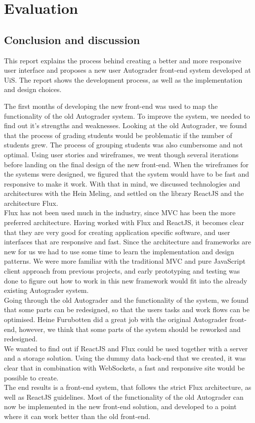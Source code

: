 \chapter{Evaluation}
\section{Conclusion and discussion}

This report explains the process behind creating a better and more responsive user interface and proposes a new user Autograder front-end system developed at UiS. The report shows the development process, as well as the implementation and design choices.

The first months of developing the new front-end was used to map the functionality of the old Autograder system. To improve the system, we needed to find out it's strengths and weaknesses. Looking at the old Autograder, we found that the process of grading students would be problematic if the number of students grew. The process of grouping students was also cumbersome and not optimal. Using user stories and wireframes, we went though several iterations before landing on the final design of the new front-end. When the wireframes for the systems were designed, we figured that the system would have to be fast and responsive to make it work. With that in mind, we discussed technologies and architectures with the Hein Meling, and settled on the library ReactJS and the architecture Flux.\\Flux has not been used much in the industry, since MVC has been the more preferred architecture. Having worked with Flux and ReactJS, it becomes clear that they are very good for creating application specific software, and user interfaces that are responsive and fast. Since the architecture and frameworks are new for us we had to use some time to learn the implementation and design patterns. We were more familiar with the traditional MVC and pure JavaScript client approach from previous projects, and early prototyping and testing was done to figure out how to work in this new framework would fit into the already existing Autograder system.
\\Going through the old Autograder and the functionality of the system, we found that some parts can be redesigned, so that the users tasks and work flows can be optimised. Heine Furubotten did a great job with the original Autograder front-end, however, we think that some parts of the system should be reworked and redesigned.
\\We wanted to find out if ReactJS and Flux could be used together with a server and a storage solution. Using the dummy data back-end that we created, it was clear that in combination with WebSockets, a fast and responsive site would be possible to create.
\\The end results is a front-end system, that follows the strict Flux architecture, as well as ReactJS guidelines. Most of the functionality of the old Autograder can now be implemented in the new front-end solution, and developed to a point where it can work better than the old front-end.

